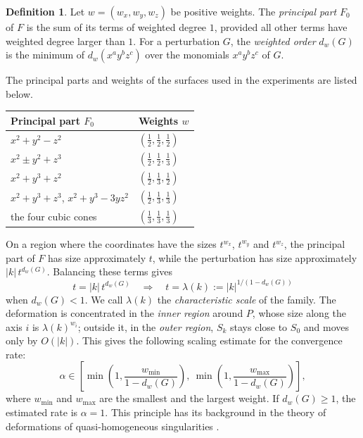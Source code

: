 \documentclass[12pt, a4paper, oneside]{book}
\theoremstyle{plain}
\theoremstyle{definition}
\newtheorem{definition}[theorem]{Definition}
\theoremstyle{remark}
\theoremstyle{definition}
\begin{document}
\begin{definition}
\label{def:principal-part}
Let $w=(w_x,w_y,w_z)$ be positive weights. The \emph{principal part} $F_0$ of $F$ is the sum of its terms of weighted degree $1$, provided all other terms have weighted degree larger than $1$. For a perturbation $G$, the \emph{weighted order} $d_w(G)$ is the minimum of $d_w(x^ay^bz^c)$ over the monomials $x^ay^bz^c$ of $G$.
\end{definition}

The principal parts and weights of the surfaces used in the experiments are listed below.
\begin{center}
\small
\begin{tabular}{l l}
\toprule
Principal part $F_0$ & Weights $w$ \\
\midrule
$x^2+y^2-z^2$ & $(\frac12,\frac12,\frac12)$ \\
$x^2\pm y^2+z^3$ & $(\frac12,\frac12,\frac13)$ \\
$x^2+y^3+z^2$ & $(\frac12,\frac13,\frac12)$ \\
$x^2+y^3+z^3$, $x^2+y^3-3yz^2$ & $(\frac12,\frac13,\frac13)$ \\
the four cubic cones & $(\frac13,\frac13,\frac13)$ \\
\bottomrule
\end{tabular}
\end{center}

On a region where the coordinates have the sizes $t^{w_x}$, $t^{w_y}$ and $t^{w_z}$, the principal part of $F$ has size approximately $t$, while the perturbation has size approximately $|k|\,t^{d_w(G)}$. Balancing these terms gives
\[
t=|k|\,t^{d_w(G)}
\quad\Longrightarrow\quad
t=\lambda(k):=|k|^{1/(1-d_w(G))}
\]
when $d_w(G)<1$. We call $\lambda(k)$ the \emph{characteristic scale} of the family. The deformation is concentrated in the \emph{inner region} around $P$, whose size along the axis $i$ is $\lambda(k)^{w_i}$; outside it, in the \emph{outer region}, $S_k$ stays close to $S_0$ and moves only by $O(|k|)$. This gives the following scaling estimate for the convergence rate:
\begin{equation}
\alpha\in
\left[
\min\left(1,\frac{w_{\min}}{1-d_w(G)}\right),\
\min\left(1,\frac{w_{\max}}{1-d_w(G)}\right)
\right],
\label{eq:r-alpha}
\end{equation}
where $w_{\min}$ and $w_{\max}$ are the smallest and the largest weight. If $d_w(G)\ge1$, the estimated rate is $\alpha=1$. This principle has its background in the theory of deformations of quasi-homogeneous singularities \cite{arnold1985singularities,greuel2007introduction}.
\end{document}
